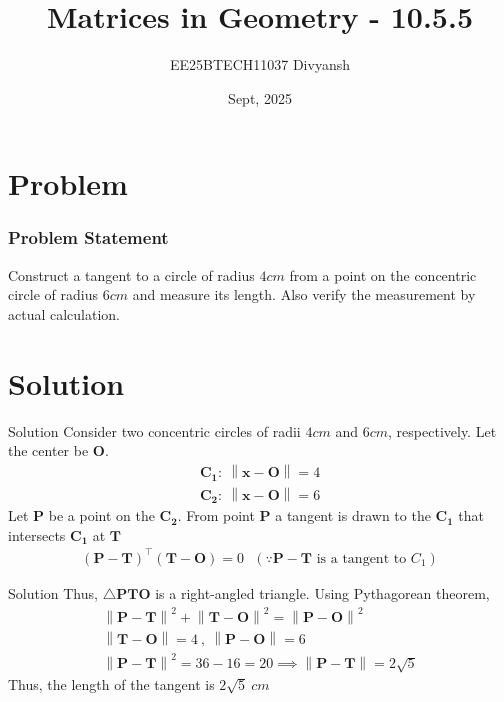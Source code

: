 \documentclass{beamer}
\title{Matrices in Geometry - 10.5.5}
\author{EE25BTECH11037  Divyansh}
\date{Sept, 2025}
\let\vec\mathbf
\providecommand{\brak}[1]{\ensuremath{\left(#1\right)}}
\theoremstyle{remark}
\providecommand{\norm}[1]{\left\lVert#1\right\rVert}
\begin{document}
    
    \maketitle
    
    
    \section{Problem}
    \begin{frame}
    \frametitle{Problem Statement}
    Construct a tangent to a circle of radius $4cm$ from a point on the concentric circle of radius $6cm$ and measure its length. Also verify the measurement by actual calculation.
    \end{frame}
    
    \section{Solution}
    \begin{frame}{Solution}
    Consider two concentric circles of radii $4cm$ and $6cm$, respectively. Let the center be $\vec{O}$.
    \begin{align}
        \vec{C_1}: \ \norm{\vec{x} - \vec{O}} = 4 \\
        \vec{C_2}: \ \norm{\vec{x} - \vec{O}} = 6 
    \end{align}
    Let $\vec{P}$ be a point on the $\vec{C_2}$. From point $\vec{P}$ a tangent is drawn to the $\vec{C_1}$ that intersects $\vec{C_1}$ at $\vec{T}$
    \begin{align}
        \brak{\vec{P} - \vec{T}}^{\top} \brak{\vec{T} - \vec{O}} = 0 \ \ \ \brak{\because \text{$\vec{P}-\vec{T}$ is a tangent to $C_1$}}
    \end{align}
    \end{frame}
    
    \begin{frame}{Solution}
    Thus, $\triangle \vec{P}\vec{T}\vec{O}$ is a right-angled triangle. Using Pythagorean theorem, 
    \begin{align}
        \norm{\vec{P} - \vec{T}}^2 + \norm{\vec{T} - \vec{O}}^2 = \norm{\vec{P} - \vec{O}}^2 \\ 
        \norm{\vec{T} - \vec{O}}=4 \ ,  \ \norm{\vec{P} - \vec{O}}=6\\
        \norm{\vec{P} - \vec{T}}^2 = 36-16 = 20 \implies \norm{\vec{P} - \vec{T}}=2\sqrt{5}
    \end{align}
    Thus, the length of the tangent is $2\sqrt{5} \ cm $
    \end{frame}
    
\end{document}
